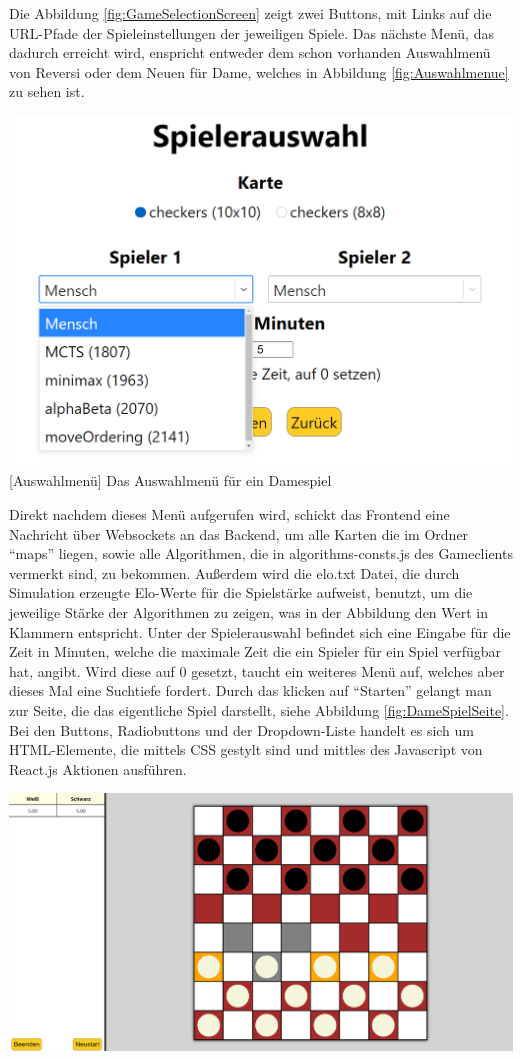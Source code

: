 \documentclass[12pt,a4paper,bibliography=totocnumbered,listof=totocnumbered]{article}
\begin{document}
Die Abbildung \ref{fig:GameSelectionScreen} zeigt zwei Buttons, mit Links auf die URL-Pfade der Spieleinstellungen der jeweiligen Spiele. 
Das nächste Menü, das dadurch erreicht wird,
enspricht entweder dem schon vorhanden Auswahlmenü von Reversi oder dem Neuen für Dame, welches in Abbildung \ref{fig:Auswahlmenue} zu sehen ist.

\vspace{1em}
\begin{minipage}{\linewidth}
	\centering
	\includegraphics[width=0.7\linewidth]{pics/AlgorithmeninderApplikation.png}
	[Auswahlmenü]{ Das Auswahlmenü für ein Damespiel }
	\label{fig:Auswahlmenue}
\end{minipage}

Direkt nachdem dieses Menü aufgerufen wird, schickt das Frontend eine Nachricht über Websockets an das Backend, um alle Karten die im Ordner ``maps'' liegen, sowie 
alle Algorithmen, die in algorithms-consts.js des Gameclients vermerkt sind, zu bekommen. Außerdem wird die elo.txt Datei, die durch 
Simulation erzeugte Elo-Werte für die Spielstärke aufweist, benutzt, um die jeweilige Stärke der Algorithmen zu zeigen, was in der Abbildung 
den Wert in Klammern entspricht. Unter der Spielerauswahl befindet sich eine Eingabe für die Zeit in Minuten, welche die maximale Zeit 
die ein Spieler für ein Spiel verfügbar hat, angibt. Wird diese auf 0 gesetzt, taucht ein weiteres Menü auf, welches aber dieses Mal eine 
Suchtiefe fordert. Durch das klicken auf ``Starten'' gelangt man zur Seite, die das eigentliche Spiel darstellt, siehe Abbildung \ref{fig:DameSpielSeite}.
Bei den Buttons, Radiobuttons und der Dropdown-Liste handelt es sich um HTML-Elemente, die mittels CSS gestylt sind und mittles 
des Javascript von React.js Aktionen ausführen.

\vspace{1em}
\begin{minipage}{\linewidth}
	\centering
	\includegraphics[width=0.7\linewidth]{pics/DameWebsiteSpiel.png}
	\label{fig:DameSpielSeite}
\end{minipage}
\end{document}
